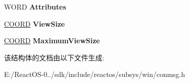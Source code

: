 \begin{DoxyCompactItemize}
\mbox{\label{struct___c_o_n_s_o_l_e___g_e_t_s_c_r_e_e_n_b_u_f_f_e_r_i_n_f_o_a966913eb22f9a982fc4b597d90db4a91}} 
W\+O\+RD {\bfseries Attributes}
\item 
\mbox{\label{struct___c_o_n_s_o_l_e___g_e_t_s_c_r_e_e_n_b_u_f_f_e_r_i_n_f_o_a3c446be91a2e1ccc84bbb29fe9a943f2}} 
\hyperlink{struct___c_o_o_r_d}{C\+O\+O\+RD} {\bfseries View\+Size}
\item 
\mbox{\label{struct___c_o_n_s_o_l_e___g_e_t_s_c_r_e_e_n_b_u_f_f_e_r_i_n_f_o_acbd3e976cd17fa130dfa4f9bc31628e6}} 
\hyperlink{struct___c_o_o_r_d}{C\+O\+O\+RD} {\bfseries Maximum\+View\+Size}
\end{DoxyCompactItemize}


该结构体的文档由以下文件生成\+:\begin{DoxyCompactItemize}
\item 
E\+:/\+React\+O\+S-\/0../sdk/include/reactos/subsys/win/conmsg.\+h\end{DoxyCompactItemize}
